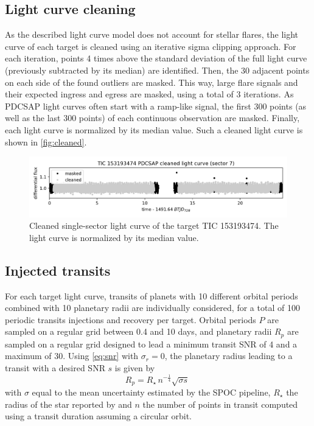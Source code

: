 \documentclass{aastex631}
\begin{document}
\subsection{Light curve cleaning}
As the described light curve model does not account for stellar flares, the light curve of each target is cleaned using an iterative sigma clipping approach. For each iteration, points 4 times above the standard deviation of the full light curve (previously subtracted by its median) are identified. Then, the 30 adjacent points on each side of the found outliers are masked. This way, large flare signals and their expected ingress and egress are masked, using a total of 3 iterations. As PDCSAP light curves often start with a ramp-like signal, the first 300 points (as well as the last 300 points) of each continuous observation are masked. Finally, each light curve is normalized by its median value. Such a cleaned light curve is shown in \autoref{fig:cleaned}.
\begin{figure}[H]
    \centering
    \includegraphics[width=\linewidth]{153193474_clean.png}
    \caption{Cleaned single-sector light curve of the target TIC 153193474. The light curve is normalized by its median value.}
    \label{fig:cleaned}
\end{figure}

\subsection{Injected transits}
For each target light curve, transits of planets with 10 different orbital periods combined with 10 planetary radii are individually considered, for a total of 100 periodic transits injections and recovery per target. Orbital periods $P$ are sampled on a regular grid between 0.4 and 10 days, and planetary radii $R_p$ are sampled on a regular grid designed to lead a minimum transit SNR of 4 and a maximum of 30. Using \autoref{eq:snr} with $\sigma_r = 0$, the planetary radius leading to a transit with a desired SNR $s$ is given by
\begin{equation*}
    R_p = R_{\star}\,n^{-\frac{1}{4}} \sqrt{\sigma s}\ %
\end{equation*}
with $\sigma$ equal to the mean uncertainty estimated by the SPOC pipeline, $R_\star$ the radius of the star reported by \cite{Ramsay2020} and $n$ the number of points in transit computed using a transit duration assuming a circular orbit.
\end{document}
